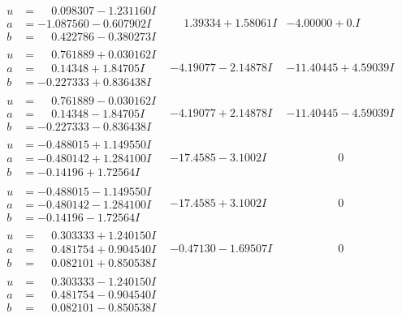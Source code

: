 \documentclass[1p]{elsarticle_modified}
\theoremstyle{definition}
\begin{document}
$$\begin{array}{c|c|c}
\begin{aligned}
u &= \phantom{-}0.098307 - 1.231160 I \\
a &= -1.087560 - 0.607902 I \\
b &= \phantom{-}0.422786 - 0.380273 I\end{aligned}
 & \phantom{-}1.39334 + 1.58061 I & -4.00000 + 0. I\phantom{ +0.000000I} \\ \hline\begin{aligned}
u &= \phantom{-}0.761889 + 0.030162 I \\
a &= \phantom{-}0.14348 + 1.84705 I \\
b &= -0.227333 + 0.836438 I\end{aligned}
 & -4.19077 - 2.14878 I & -11.40445 + 4.59039 I \\ \hline\begin{aligned}
u &= \phantom{-}0.761889 - 0.030162 I \\
a &= \phantom{-}0.14348 - 1.84705 I \\
b &= -0.227333 - 0.836438 I\end{aligned}
 & -4.19077 + 2.14878 I & -11.40445 - 4.59039 I \\ \hline\begin{aligned}
u &= -0.488015 + 1.149550 I \\
a &= -0.480142 + 1.284100 I \\
b &= -0.14196 + 1.72564 I\end{aligned}
 & -17.4585 - 3.1002 I & \phantom{-0.000000 } 0 \\ \hline\begin{aligned}
u &= -0.488015 - 1.149550 I \\
a &= -0.480142 - 1.284100 I \\
b &= -0.14196 - 1.72564 I\end{aligned}
 & -17.4585 + 3.1002 I & \phantom{-0.000000 } 0 \\ \hline\begin{aligned}
u &= \phantom{-}0.303333 + 1.240150 I \\
a &= \phantom{-}0.481754 + 0.904540 I \\
b &= \phantom{-}0.082101 + 0.850538 I\end{aligned}
 & -0.47130 - 1.69507 I & \phantom{-0.000000 } 0 \\ \hline\begin{aligned}
u &= \phantom{-}0.303333 - 1.240150 I \\
a &= \phantom{-}0.481754 - 0.904540 I \\
b &= \phantom{-}0.082101 - 0.850538 I\end{aligned}

\end{array}$$
\end{document}
